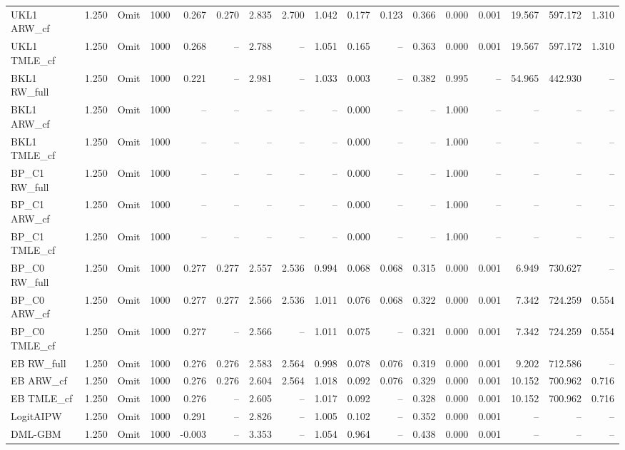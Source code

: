 \begin{tabular}{llllrrrrrrrrrrrrr}
UKL1 ARW\_cf & 1.250 & Omit & 1000 & 0.267 & 0.270 & 2.835 & 2.700 & 1.042 & 0.177 & 0.123 & 0.366 & 0.000 & 0.001 & 19.567 & 597.172 & 1.310 \\
UKL1 TMLE\_cf & 1.250 & Omit & 1000 & 0.268 & -- & 2.788 & -- & 1.051 & 0.165 & -- & 0.363 & 0.000 & 0.001 & 19.567 & 597.172 & 1.310 \\
BKL1 RW\_full & 1.250 & Omit & 1000 & 0.221 & -- & 2.981 & -- & 1.033 & 0.003 & -- & 0.382 & 0.995 & -- & 54.965 & 442.930 & -- \\
BKL1 ARW\_cf & 1.250 & Omit & 1000 & -- & -- & -- & -- & -- & 0.000 & -- & -- & 1.000 & -- & -- & -- & -- \\
BKL1 TMLE\_cf & 1.250 & Omit & 1000 & -- & -- & -- & -- & -- & 0.000 & -- & -- & 1.000 & -- & -- & -- & -- \\
BP\_C1 RW\_full & 1.250 & Omit & 1000 & -- & -- & -- & -- & -- & 0.000 & -- & -- & 1.000 & -- & -- & -- & -- \\
BP\_C1 ARW\_cf & 1.250 & Omit & 1000 & -- & -- & -- & -- & -- & 0.000 & -- & -- & 1.000 & -- & -- & -- & -- \\
BP\_C1 TMLE\_cf & 1.250 & Omit & 1000 & -- & -- & -- & -- & -- & 0.000 & -- & -- & 1.000 & -- & -- & -- & -- \\
BP\_C0 RW\_full & 1.250 & Omit & 1000 & 0.277 & 0.277 & 2.557 & 2.536 & 0.994 & 0.068 & 0.068 & 0.315 & 0.000 & 0.001 & 6.949 & 730.627 & -- \\
BP\_C0 ARW\_cf & 1.250 & Omit & 1000 & 0.277 & 0.277 & 2.566 & 2.536 & 1.011 & 0.076 & 0.068 & 0.322 & 0.000 & 0.001 & 7.342 & 724.259 & 0.554 \\
BP\_C0 TMLE\_cf & 1.250 & Omit & 1000 & 0.277 & -- & 2.566 & -- & 1.011 & 0.075 & -- & 0.321 & 0.000 & 0.001 & 7.342 & 724.259 & 0.554 \\
EB RW\_full & 1.250 & Omit & 1000 & 0.276 & 0.276 & 2.583 & 2.564 & 0.998 & 0.078 & 0.076 & 0.319 & 0.000 & 0.001 & 9.202 & 712.586 & -- \\
EB ARW\_cf & 1.250 & Omit & 1000 & 0.276 & 0.276 & 2.604 & 2.564 & 1.018 & 0.092 & 0.076 & 0.329 & 0.000 & 0.001 & 10.152 & 700.962 & 0.716 \\
EB TMLE\_cf & 1.250 & Omit & 1000 & 0.276 & -- & 2.605 & -- & 1.017 & 0.092 & -- & 0.328 & 0.000 & 0.001 & 10.152 & 700.962 & 0.716 \\
LogitAIPW & 1.250 & Omit & 1000 & 0.291 & -- & 2.826 & -- & 1.005 & 0.102 & -- & 0.352 & 0.000 & 0.001 & -- & -- & -- \\
DML-GBM & 1.250 & Omit & 1000 & -0.003 & -- & 3.353 & -- & 1.054 & 0.964 & -- & 0.438 & 0.000 & 0.001 & -- & -- & -- \\

\end{tabular}
